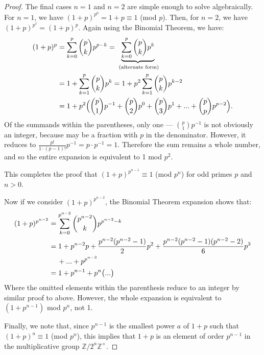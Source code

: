 \documentclass{article}
\begin{document}
\begin{proof}
    The final cases $n = 1$ and $n = 2$ are simple enough to solve algebraically. For $n = 1$, we have $(1 + p)^{p^0} = 1 + p \equiv 1$ (mod $p$). Then, for $n = 2$, we have $(1 + p)^{p^1} = (1 + p)^p$. Again using the Binomial Theorem, we have:
    \begin{align*}
        (1 + p)^p 
        & = \sum_{k = 0}^{p} \binom{p}{k} p^{p - k} = \underbrace{\sum_{k = 0}^{p} \binom{p}{k} p^k}_{\text{ (alternate form)}} \\ 
        & = 1 + \sum_{k = 1}^{p} \binom{p}{k} p^k = 1 + p^2 \sum_{k = 1}^{p} \binom{p}{k} p^{k - 2} \\
        & = 1 + p^2 \Bigl(\binom{p}{1} p^{-1} + \binom{p}{2} p^0 + \binom{p}{3} p^1 + ... + \binom{p}{p} p^{p - 2} \Bigr).
    \end{align*}
    Of the summands within the parentheses, only one — $\binom{p}{1} p^{-1}$ is not obviously an integer, because may be a fraction with $p$ in the denominator. However, it reduces to $\frac{p!}{1 \cdot (p - 1)!} p^{-1} = p \cdot p^{-1} = 1$. Therefore the sum remains a whole number, and so the entire expansion is equivalent to 1 mod $p^2$.

    This completes the proof that $(1 + p)^{p^{n - 1}} \equiv 1$ (mod $p^n$) for odd primes $p$ and $n > 0$.

    Now if we consider $(1 + p)^{p^{n - 2}}$, the Binomial Theorem expansion shows that:
    \begin{align*}
        (1 + p)^{p^{n - 2}} 
        & = \sum_{k = 0}^{p^{n - 2}} \binom{p^{n - 2}}{k} p^{{p^{n - 2}} - k} \\ 
        & = 1 + p^{n - 2} p + \frac{p^{n - 2}(p^{n - 2} - 1)}{2}p^2 + \frac{p^{n - 2}(p^{n - 2} - 1)(p^{n - 2} - 2)}{6}p^3 \\
        & \hspace{1.2em} + ... + p^{p^{n - 2}} \\
        & = 1 + p^{n - 1} + p^n \bigl( ... \bigr)
    \end{align*}
    Where the omitted elements within the parenthesis reduce to an integer by similar proof to above. However, the whole expansion is equivalent to $(1 + p^{n - 1})$ mod $p^n$, not 1.

    Finally, we note that, since $p^{n - 1}$ is the smallest power $a$ of $1 + p$ such that $(1 + p)^a \equiv 1$ (mod $p^n$), this implies that $1 + p$ is an element of order $p^{n - 1}$ in the multiplicative group $\mathbb{Z}/2^n\mathbb{Z}^\times$.
\end{proof}
\end{document}
